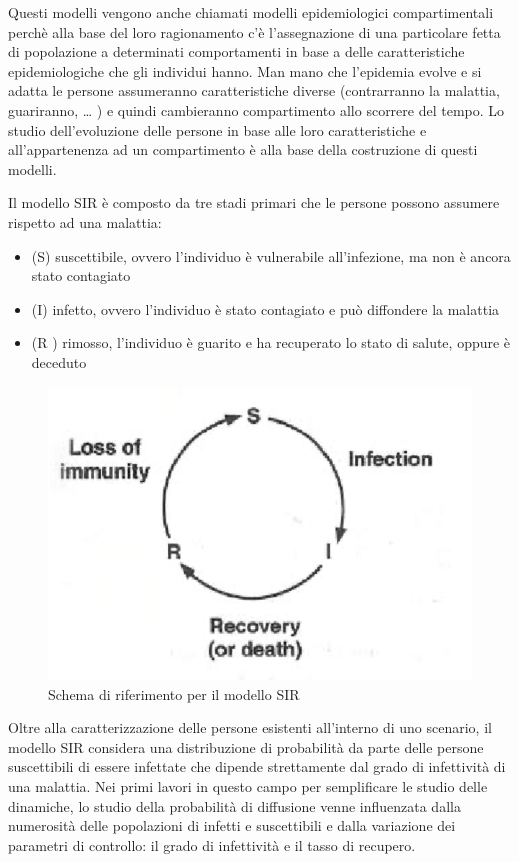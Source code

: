 \documentclass[11pt]{article}
\begin{document}
Questi modelli vengono anche chiamati modelli epidemiologici compartimentali \cite{ScienceConnectedAge} perchè alla base del loro ragionamento c'è l'assegnazione di una particolare fetta di popolazione a determinati comportamenti in base a delle caratteristiche epidemiologiche che gli individui hanno. Man mano che l'epidemia evolve e si adatta le persone assumeranno caratteristiche diverse (contrarranno la malattia, guariranno, … ) e quindi cambieranno compartimento allo scorrere del tempo. Lo studio dell'evoluzione delle persone in base alle loro caratteristiche e all'appartenenza ad un compartimento è alla base della costruzione di questi modelli.

Il modello SIR è composto da tre stadi primari che le persone possono assumere rispetto ad una malattia: 
\begin{itemize}
    \item (S) suscettibile, ovvero l'individuo è vulnerabile all'infezione, ma non è ancora stato contagiato
    \item (I) infetto, ovvero l'individuo è stato contagiato e può diffondere la malattia
    \item (R ) rimosso, l'individuo è guarito e ha recuperato lo stato di salute, oppure è deceduto
\end{itemize}

\begin{figure}[H]
    \includegraphics[width=16cm]{resources/sir_circle.png}
    \caption{Schema di riferimento per il modello SIR} 
\end{figure}

Oltre alla caratterizzazione delle persone esistenti all'interno di uno scenario, il modello SIR considera una distribuzione di probabilità da parte delle persone suscettibili di essere infettate che dipende strettamente dal grado di infettività di una malattia. Nei primi lavori in questo campo per semplificare le studio delle dinamiche, lo studio della probabilità di diffusione venne influenzata dalla numerosità delle popolazioni di infetti e suscettibili e dalla variazione dei parametri di controllo: il grado di infettività e il tasso di recupero.
\end{document}
